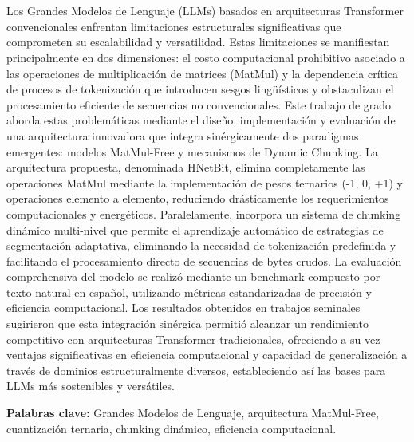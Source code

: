 \documentclass[12pt]{report}
\makeatletter
\renewenvironment{abstract}{%
    \if@twocolumn%
      \section*{\abstractname}%
    \else %
      \begin{center}%
        {\bfseries \Large\abstractname\vspace{\z@}}%
      \end{center}%
      \quotation%
    \fi}
    {\if@twocolumn\else\endquotation\fi}
\makeatother
\begin{document}
\begin{abstract}
Los Grandes Modelos de Lenguaje (LLMs) basados en arquitecturas Transformer convencionales enfrentan limitaciones estructurales significativas que comprometen su escalabilidad y versatilidad. Estas limitaciones se manifiestan principalmente en dos dimensiones: el costo computacional prohibitivo asociado a las operaciones de multiplicación de matrices (MatMul) y la dependencia crítica de procesos de tokenización que introducen sesgos lingüísticos y obstaculizan el procesamiento eficiente de secuencias no convencionales. Este trabajo de grado aborda estas problemáticas mediante el diseño, implementación y evaluación de una arquitectura innovadora que integra sinérgicamente dos paradigmas emergentes: modelos MatMul-Free y mecanismos de Dynamic Chunking. La arquitectura propuesta, denominada HNetBit, elimina completamente las operaciones MatMul mediante la implementación de pesos ternarios (-1, 0, +1) y operaciones elemento a elemento, reduciendo drásticamente los requerimientos computacionales y energéticos. Paralelamente, incorpora un sistema de chunking dinámico multi-nivel que permite el aprendizaje automático de estrategias de segmentación adaptativa, eliminando la necesidad de tokenización predefinida y facilitando el procesamiento directo de secuencias de bytes crudos. La evaluación comprehensiva del modelo se realizó mediante un benchmark compuesto por texto natural en español, utilizando métricas estandarizadas de precisión y eficiencia computacional. Los resultados obtenidos en trabajos seminales sugirieron que esta integración sinérgica permitió alcanzar un rendimiento competitivo con arquitecturas Transformer tradicionales, ofreciendo a su vez ventajas significativas en eficiencia computacional y capacidad de generalización a través de dominios estructuralmente diversos, estableciendo así las bases para LLMs más sostenibles y versátiles.
\end{abstract}

\vspace{0.5cm}
\noindent\textbf{Palabras clave:} Grandes Modelos de Lenguaje, arquitectura MatMul-Free, cuantización ternaria, chunking dinámico, eficiencia computacional.

\newpage

\begin{center}
    \tableofcontents
\end{center}


\newpage

\begin{center}
    \listoffigures
\end{center}
\end{document}
